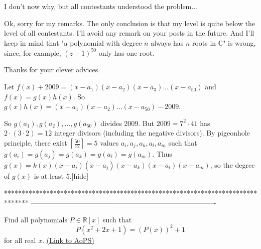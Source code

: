 \begin{solution}
	\begin{tcolorbox} I don't now why, but all contestants understood the problem... \end{tcolorbox}

Ok, sorry for my remarks. The only conclusion is that my level is quite below the level of all contestants. I'll avoid any remark on your posts in the future. And I'll keep in mind that "a polynomial with degree $ n$ always has $ n$ roots in $ \mathbb C$" is wrong, since, for example, $ (z-1)^{50}$ only has one root. 

Thanks for your clever advices.
\end{solution}



\begin{solution}Let $ f(x)+2009=(x-a_1)(x-a_2)(x-a_3)\ldots(x-a_{50})$ and $ f(x)=g(x)h(x)$. So $ g(x)h(x)=(x-a_1)(x-a_2)\ldots(x-a_{50})-2009$.

So $ g(a_1),g(a_2),\ldots,g(a_{50})$ divides 2009. But $ 2009=7^2\cdot41$ has $ 2\cdot(3\cdot2)=12$ integer divisors (including the negative divisors). By pigeonhole principle, there exist $ \left\lceil\frac{50}{12}\right\rceil=5$ values $ a_i,a_j,a_k,a_l,a_m$ such that $ g(a_i)=g(a_j)=g(a_k)=g(a_l)=g(a_m)$. Thus $ g(x)=k(x)(x-a_i)(x-a_j)(x-a_k)(x-a_l)(x-a_m)$, so the degree of $ g(x)$ is at least 5.[\/hide]
\end{solution}
*******************************************************************************
-------------------------------------------------------------------------------

\begin{problem}
	Find all polynomials $ P\in \mathbb {R}[x]$ such that \[ P(x^2+2x+1)=(P(x))^2+1\] for all real $x$.
	\flushright \href{https://artofproblemsolving.com/community/c6h282534}{(Link to AoPS)}
\end{problem}



